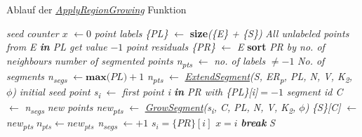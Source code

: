 \begin{algorithm}
	\caption{Ablauf der \textit{\hyperref[alg:apply_region_growing]{ApplyRegionGrowing}} Funktion}
	\label{alg:apply_region_growing}
	\begin{algorithmic}[1]
		\State \textit{seed counter $x$} $\gets 0$
		\State \textit{point labels \{PL\}} $\gets$ \textbf{size}\textit{(\{E\} + \{S\})}
		\State \textit{All unlabeled points from E \textbf{in} PL get value }$-1$
		\State \textit{point residuals \{PR\}} $\gets$ \textit{E}
		\State \textbf{sort} \textit{PR by no. of neighbours}
		\State \textit{number of segmented points n\textsubscript{pts}} $\gets$ \textit{no. of labels} $\neq -1$
		\State \textit{No. of segments n\textsubscript{segs}} $\gets \textbf{max}\textit{(PL)} + 1$
		\State \textit{n\textsubscript{pts}} $\gets$ \textit{\hyperref[alg: extend_segments]{ExtendSegment}(S, ER\textsubscript{p}, PL, N, V, K\textsubscript{2}, $\phi$)}
		\State \textit{initial seed point s\textsubscript{i}} $\gets$ \textit{first point i \textbf{in} PR with \{PL\}[i]}$= -1$
		\State \textit{segment id C} $\gets$ \textit{n\textsubscript{segs}}
		\State \textit{new points new\textsubscript{pts}} $\gets$ \textit{\hyperref[alg:grow_segment]{GrowSegment}(s\textsubscript{i}, C, PL, N, V,  K\textsubscript{2}, $\phi$)}
		\State \textit{\{S\}[C]} $\gets$ \textit{new\textsubscript{pts}}
		\State $n_{pts} \gets new_{pts}$
		\State \textit{n\textsubscript{segs}} $\gets + 1$
		\State $s_i = \{PR\}[i]$
		\State $x = i$
		\State \textit{\textbf{break}}
		\EndIf
		\EndFor
		\EndWhile
		\State \Return \textit{S}
		\EndFunction
	\end{algorithmic}
\end{algorithm}

